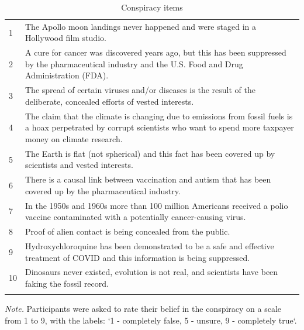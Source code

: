 \documentclass[
  doc,floatsintext]{apa6}
\begin{document}
\begin{table}[tbp]

\begin{center}
\begin{threeparttable}

\caption{\label{tab:conspiracy}Conspiracy items}

\begin{tabular}{lp{10cm}}
\toprule
 & \\
\midrule
1 & The Apollo moon landings never happened and were staged in a Hollywood film studio.\\
2 & A cure for cancer was discovered years ago, but this has been suppressed by the pharmaceutical industry and the U.S. Food and Drug Administration (FDA).\\
3 & The spread of certain viruses and/or diseases is the result of the deliberate, concealed efforts of vested interests.\\
4 & The claim that the climate is changing due to emissions from fossil fuels is a hoax perpetrated by corrupt scientists who want to spend more taxpayer money on climate research.\\
5 & The Earth is flat (not spherical) and this fact has been covered up by scientists and vested interests.\\
6 & There is a causal link between vaccination and autism that has been covered up by the pharmaceutical industry.\\
7 & In the 1950s and 1960s more than 100 million Americans received a polio vaccine contaminated with a potentially cancer-causing virus.\\
8 & Proof of alien contact is being concealed from the public.\\
9 & Hydroxychloroquine has been demonstrated to be a safe and effective treatment of COVID and this information is being suppressed.\\
10 & Dinosaurs never existed, evolution is not real, and scientists have been faking the fossil record.\\
\bottomrule
\addlinespace
\end{tabular}

\begin{tablenotes}[para]
\normalsize{\textit{Note.} Participants were asked to rate their belief in the conspiracy on a scale from 1 to 9, with the labels: `1 - completely false, 5 - unsure, 9 - completely true`.}
\end{tablenotes}

\end{threeparttable}
\end{center}

\end{table}
\end{document}
